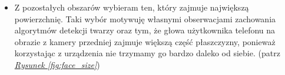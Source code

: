 \begin{itemize}
    \item Z pozostałych obszarów wybieram ten, który zajmuje największą powierzchnię. Taki wybór motywuję własnymi obserwacjami zachowania algorytmów detekcji twarzy oraz tym, że głowa użytkownika telefonu na obrazie z kamery przedniej zajmuje większą część płaszczyzny, ponieważ korzystając z urządzenia nie trzymamy go bardzo daleko od siebie. (patrz \hyperref[{fig:face_size}]{\textit{Rysunek \ref{fig:face_size}}})
    
    \begin{figure}[!h]
        \begin{center}
            \hspace{8mm}

\end{center}
\end{figure}
\end{itemize}
